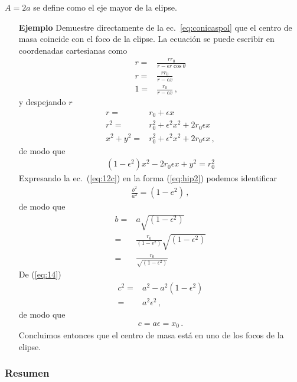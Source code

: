 $A=2a$ se define como el eje mayor de la elipse. 

\begin{itemize}
\item[\textbf{Ejemplo}] Demuestre directamente de la ec.~\eqref{eq:conicaspol} que  
el centro de masa coincide con el foco de la elipse.  
La ecuación se puede escribir en coordenadas cartesianas como
\begin{align}
  r=&\frac{r r_0}{r-\epsilon r\cos\theta}\nonumber\\
  r=&\frac{r r_0}{r-\epsilon x}\nonumber\\
  1=&\frac{r_0}{r-\epsilon x}\,,
\end{align}
y despejando $r$
\begin{align}
  r=&r_0+\epsilon x\nonumber\\
  r^2=&r_0^2+\epsilon^2 x^2+2r_0\epsilon x\nonumber\\
  x^2+y^2=&r_0^2+\epsilon^2 x^2+2r_0\epsilon x\,,
\end{align}
de modo que
\begin{align}
  \label{eq:12c}
  (1-\epsilon^2)x^2-2 r_0 \epsilon x +y^2=r_0^2
\end{align}
Expresando la ec.~(\ref{eq:12c}) en la forma (\ref{eq:hip2}) podemos identificar
\begin{align}
  \frac{b^2}{a^2}=(1-e^2)\,,
\end{align}
 de modo que
 \begin{align}
   \label{eq:18}
   b=&a\sqrt{(1-\epsilon^2)}\nonumber\\
   =&\frac{r_0}{(1-\epsilon^2)}\sqrt{(1-\epsilon^2)}\nonumber\\
   =&\frac{r_0}{\sqrt{(1-\epsilon^2)}}
 \end{align}
De (\ref{eq:14})
\begin{align}
  c^2=&a^2-a^2(1-\epsilon^2)\nonumber\\
  =&a^2\epsilon^2\,,
\end{align}
de modo que
\begin{align}
  c=a \epsilon=x_0\,.
\end{align}
Concluimos entonces que el centro de masa está en uno de los focos de la elipse.

\end{itemize}


\subsubsection{Resumen}

